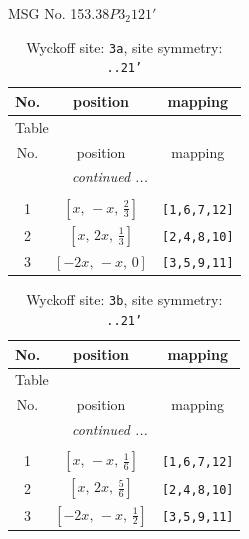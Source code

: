 \documentclass[fleqn,8pt]{jsarticle}
\begin{document}
\setcounter{MaxMatrixCols}{32}

\renewcommand{\tablename}{Table~}
\renewcommand{\figurename}{Figure~}
\begin{center}
\LARGE
MSG No. 153.38\quad$P3_{2}121'$
\end{center}
\renewcommand{\arraystretch}{1.2}
\begin{longtable}{ccc}
\caption{Wyckoff site: {\tt 3a}, site symmetry: {\tt ..21'}}
 \\
 \hline \hline
No. & position & mapping \\ \hline \endfirsthead

\multicolumn{2}{l}{\tablename\ \thetable{}} \\
 \hline \hline
No. & position & mapping \\ \hline \endhead

 \hline \hline
\multicolumn{2}{r}{\footnotesize\it continued ...} \\ \endfoot

 \hline \hline
\multicolumn{2}{r}{} \\ \endlastfoot

1 & $\left[ x,\, - x,\, \frac{2}{3} \right]$ & {\tt [1,6,7,12]} \\ \hline
2 & $\left[ x,\, 2 x,\, \frac{1}{3} \right]$ & {\tt [2,4,8,10]} \\ \hline
3 & $\left[ - 2 x,\, - x,\, 0 \right]$ & {\tt [3,5,9,11]} \\
\end{longtable}
\renewcommand{\arraystretch}{1.2}
\begin{longtable}{ccc}
\caption{Wyckoff site: {\tt 3b}, site symmetry: {\tt ..21'}}
 \\
 \hline \hline
No. & position & mapping \\ \hline \endfirsthead

\multicolumn{2}{l}{\tablename\ \thetable{}} \\
 \hline \hline
No. & position & mapping \\ \hline \endhead

 \hline \hline
\multicolumn{2}{r}{\footnotesize\it continued ...} \\ \endfoot

 \hline \hline
\multicolumn{2}{r}{} \\ \endlastfoot

1 & $\left[ x,\, - x,\, \frac{1}{6} \right]$ & {\tt [1,6,7,12]} \\ \hline
2 & $\left[ x,\, 2 x,\, \frac{5}{6} \right]$ & {\tt [2,4,8,10]} \\ \hline
3 & $\left[ - 2 x,\, - x,\, \frac{1}{2} \right]$ & {\tt [3,5,9,11]} \\
\end{longtable}
\end{document}
